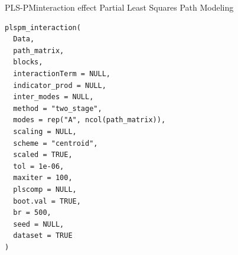 \documentclass[a4paper]{book}
\begin{document}
%
\begin{Description}
PLS-PMinteraction effect  Partial Least Squares Path Modeling
\end{Description}
%
\begin{Usage}
\begin{verbatim}
plspm_interaction(
  Data,
  path_matrix,
  blocks,
  interactionTerm = NULL,
  indicator_prod = NULL,
  inter_modes = NULL,
  method = "two_stage",
  modes = rep("A", ncol(path_matrix)),
  scaling = NULL,
  scheme = "centroid",
  scaled = TRUE,
  tol = 1e-06,
  maxiter = 100,
  plscomp = NULL,
  boot.val = TRUE,
  br = 500,
  seed = NULL,
  dataset = TRUE
)
\end{verbatim}
\end{Usage}
%
\end{document}
